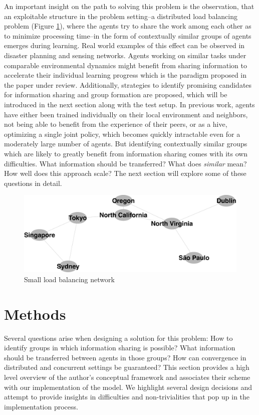 \documentclass[letterpaper]{article}
\begin{document}
An important insight on the path to solving this problem is the observation, that an exploitable structure in the problem setting--a distributed load balancing problem (Figure \ref{fig:loadbalancing}), where the agents try to share the work among each other as to minimize processing time--in the form of contextually similar groups of agents emerges during learning. Real world examples of this effect can be observed in disaster planning and sensing networks. Agents working on similar tasks under comparable environmental dynamics might benefit from sharing information to accelerate their individual learning progress which is the paradigm proposed in the paper under review. Additionally, strategies to identify promising candidates for information sharing and group formation are proposed, which will be introduced in the next section along with the test setup. In previous work, agents have either been trained individually on their local environment and neighbors, not being able to benefit from the experience of their peers, or as a hive, optimizing a single joint policy, which becomes quickly intractable even for a moderately large number of agents. But identifying contextually similar groups which are likely to greatly benefit from information sharing comes with its own difficulties. What information should be transferred? What does \textit{similar} mean? How well does this approach scale? The next section will explore some of these questions in detail.
\begin{figure}[H]
 \begin{center}
  \includegraphics[width=.7\linewidth]{figures/loadbalancing}
  \caption{Small load balancing network \citep{garant2015accelerating}}
  \label{fig:loadbalancing}
 \end{center}
\end{figure}

\section{Methods} \label{sec:methods}
Several questions arise when designing a solution for this problem: How to identify groups in which information sharing is possible? What information should be transferred between agents in those groups? How can convergence in distributed and concurrent settings be guaranteed? This section provides a high level overview of the author’s conceptual framework and associates their scheme with our implementation of the model.  We highlight several design decisions and attempt to provide insights in difficulties and non-trivialities that pop up in the implementation process.
\end{document}
